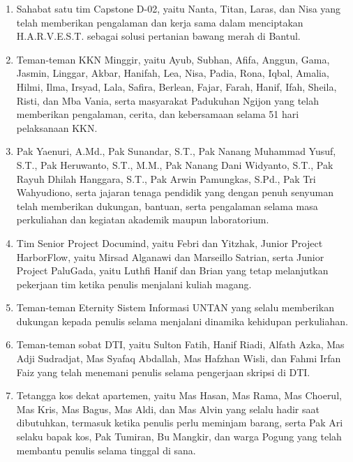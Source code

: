 \begin{enumerate}
	\item Sahabat satu tim Capstone D-02, yaitu Nanta, Titan, Laras, dan Nisa
	yang telah memberikan pengalaman dan kerja sama dalam menciptakan
	H.A.R.V.E.S.T. sebagai solusi pertanian bawang merah di Bantul.
	
	\item Teman-teman KKN Minggir, yaitu Ayub, Subhan, Afifa, Anggun, Gama,
	Jasmin, Linggar, Akbar, Hanifah, Lea, Nisa, Padia, Rona, Iqbal, Amalia,
	Hilmi, Ilma, Irsyad, Lala, Safira, Berlean, Fajar, Farah, Hanif, Ifah,
	Sheila, Risti, dan Mba Vania, serta masyarakat Padukuhan Ngijon yang telah
	memberikan pengalaman, cerita, dan kebersamaan selama 51 hari pelaksanaan
	KKN.
	
	\item Pak Yaenuri, A.Md., Pak Sunandar, S.T., Pak Nanang Muhammad Yusuf,
	S.T., Pak Heruwanto, S.T., M.M., Pak Nanang Dani Widyanto, S.T., Pak Rayuh
	Dhilah Hanggara, S.T., Pak Arwin Pamungkas, S.Pd., Pak Tri Wahyudiono, serta
	jajaran tenaga pendidik yang dengan penuh senyuman telah memberikan dukungan,
	bantuan, serta pengalaman selama masa perkuliahan dan kegiatan akademik
	maupun laboratorium.

	\item Tim Senior Project Documind, yaitu Febri dan Yitzhak, Junior Project
	HarborFlow, yaitu Mirsad Alganawi dan Marseillo Satrian, serta Junior
	Project PaluGada, yaitu Luthfi Hanif dan Brian yang tetap melanjutkan
	pekerjaan tim ketika penulis menjalani kuliah magang.
	
	\item Teman-teman Eternity Sistem Informasi UNTAN yang selalu memberikan
	dukungan kepada penulis selama menjalani dinamika kehidupan perkuliahan.
	
	\item Teman-teman sobat DTI, yaitu Sulton Fatih, Hanif Riadi, Alfath Azka,
	Mas Adji Sudradjat, Mas Syafaq Abdallah, Mas Hafzhan Wisli, dan Fahmi
	Irfan Faiz yang telah menemani penulis selama pengerjaan skripsi di DTI.
	
	\item Tetangga kos dekat apartemen, yaitu Mas Hasan, Mas Rama, Mas
	Choerul, Mas Kris, Mas Bagus, Mas Aldi, dan Mas Alvin yang selalu hadir
	saat dibutuhkan, termasuk ketika penulis perlu meminjam barang, serta Pak
	Ari selaku bapak kos, Pak Tumiran, Bu Mangkir, dan warga Pogung yang telah
	membantu penulis selama tinggal di sana.

\end{enumerate}

